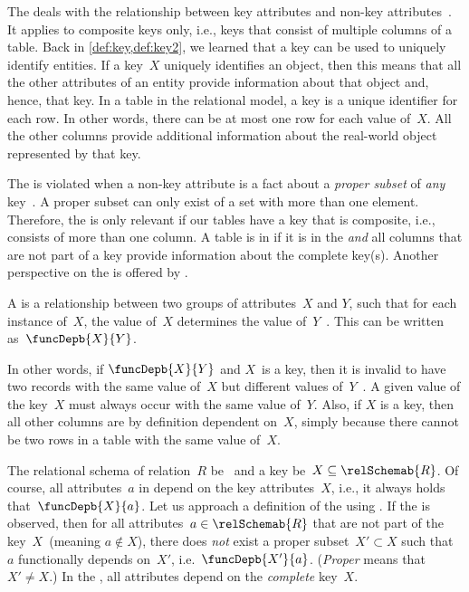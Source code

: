 %
\label{sec:normalForm:2}%
%
The  deals with the relationship between key attributes and non-key attributes~\cite{C1971FNOTDBRM,C1971NDBSABT,K1983ASGTFNFIRDT,D2003AITDS,EN2015FODS}.
It applies to composite keys only, i.e., keys that consist of multiple columns of a table.
Back in \cref{def:key,def:key2}, we learned that a key can be used to uniquely identify entities.
If a key~$X$ uniquely identifies an object, then this means that all the other attributes of an entity provide information about that object and, hence, that key.
In a table in the relational model, a key is a unique identifier for each row.
In other words, there can be at most one row for each value of~$X$.
All the other columns provide additional information about the real-world object represented by that key.

The  is violated when a non-key attribute is a fact about a \emph{proper subset} of \emph{any} key~\cite{K1983ASGTFNFIRDT}.
A proper subset can only exist of a set with more than one element.
Therefore, the  is only relevant if our tables have a key that is composite, i.e., consists of more than one column.
A table is in  if it is in the  \emph{and} all columns that are not part of a key provide information about the complete key(s).
Another perspective on the  is offered by .%
%
\begin{definition}%
\label{def:functionalDependency}%
A \emph{} is a relationship between two groups of attributes~$X$ and $Y$, such that for each instance of~$X$, the value of~$X$ determines the value of~$Y$~\cite{S2024D:RNDAFDNF}. %
This can be written as~$\funcDepb{X}{Y}$.%
\end{definition}%
%
In other words, if $\funcDepb{X}{Y}$ and $X$~is a key, then it is invalid to have two records with the same value of~$X$ but different values of~$Y$~\cite{K1983ASGTFNFIRDT}.
A given value of the key~$X$ must always occur with the same value of~$Y$.
Also, if $X$ is a key, then all other columns are by definition dependent on~$X$, simply because there cannot be two rows in a table with the same value of~$X$.

The relational schema of relation~$R$ be~ and a key be~$X\subseteq\relSchemab{R}$.
Of course, all attributes~$a$ in depend on the key attributes~$X$, i.e., it always holds that~$\funcDepb{X}{a}$.
Let us approach a definition of the  using .
If the  is observed, then for all attributes~$a\in\relSchemab{R}$ that are not part of the key~$X$~(meaning $a \not\in X$), there does \emph{not} exist a proper subset~$X'\subset X$ such that~$a$ functionally depends on~$X'$, i.e.~$\funcDepb{X'}{a}$.
(\emph{Proper} means that $X'\neq X$.)
In the , all attributes depend on the \emph{complete} key~$X$.

